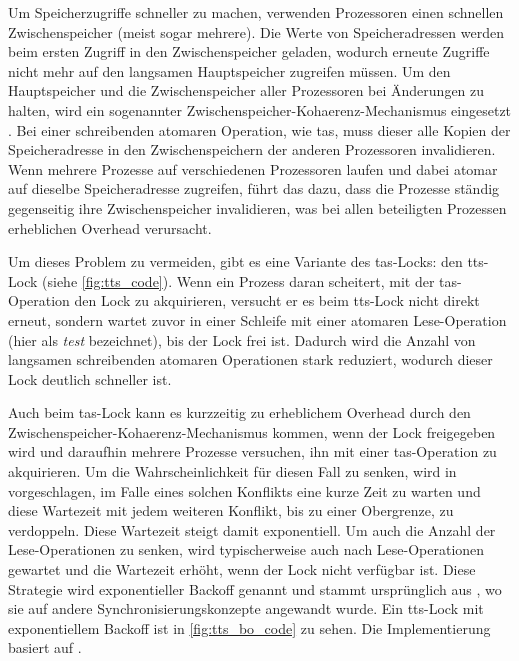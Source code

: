 Um Speicherzugriffe schneller zu machen,
verwenden Prozessoren einen schnellen \gls{Zwischenspeicher}
(meist sogar mehrere).
Die Werte von Speicheradressen werden beim ersten Zugriff in den \gls{Zwischenspeicher} geladen,
wodurch erneute Zugriffe nicht mehr auf den langsamen Hauptspeicher zugreifen müssen.
Um den Hauptspeicher und die Zwischenspeicher aller Prozessoren
bei Änderungen  zu halten,
wird ein sogenannter \gls{Zwischenspeicher}-\gls{Kohaerenz}-Mechanismus eingesetzt \cite{cache-coherence}.
Bei einer schreibenden atomaren Operation,
wie \gls{tas},
muss dieser alle Kopien der Speicheradresse in den \gls{Zwischenspeicher}n der anderen Prozessoren invalidieren.
Wenn mehrere Prozesse auf verschiedenen Prozessoren laufen
und dabei atomar auf dieselbe Speicheradresse zugreifen,
führt das dazu,
dass die Prozesse ständig gegenseitig ihre \gls{Zwischenspeicher} invalidieren,
was bei allen beteiligten Prozessen erheblichen Overhead verursacht.

Um dieses Problem zu vermeiden,
gibt es eine Variante des \gls{tas}-Locks:
den \gls{tts}-Lock \cite{TTS-Lock} (siehe \autoref{fig:tts_code}).
Wenn ein Prozess daran scheitert,
mit der \gls{tas}-Operation den Lock zu akquirieren,
versucht er es beim \gls{tts}-Lock nicht direkt erneut,
sondern wartet zuvor in einer Schleife mit einer atomaren Lese-Operation
(hier als \textit{test} bezeichnet),
bis der Lock frei ist.
Dadurch wird die Anzahl von langsamen schreibenden atomaren Operationen stark reduziert,
wodurch dieser Lock deutlich schneller ist.

Auch beim \gls{tas}-Lock kann es kurzzeitig zu erheblichem Overhead
durch den \gls{Zwischenspeicher}-\gls{Kohaerenz}-Mechanismus kommen,
wenn der Lock freigegeben wird und daraufhin mehrere Prozesse versuchen,
ihn mit einer \gls{tas}-Operation zu akquirieren.
Um die Wahrscheinlichkeit für diesen Fall zu senken,
wird in \cite{TTS-backoff} vorgeschlagen,
im Falle eines solchen Konflikts eine kurze Zeit zu warten
und diese Wartezeit mit jedem weiteren Konflikt,
bis zu einer Obergrenze,
zu verdoppeln.
Diese Wartezeit steigt damit exponentiell.
Um auch die Anzahl der Lese-Operationen zu senken,
wird typischerweise auch nach Lese-Operationen
gewartet und die Wartezeit erhöht,
wenn der Lock nicht verfügbar ist.
Diese Strategie wird exponentieller Backoff genannt und stammt ursprünglich aus \cite{backoff},
wo sie auf andere Synchronisierungskonzepte angewandt wurde.
Ein \gls{tts}-Lock mit exponentiellem Backoff ist in \autoref{fig:tts_bo_code} zu sehen.
Die Implementierung basiert auf \cite{TTS-backoff-code}.

